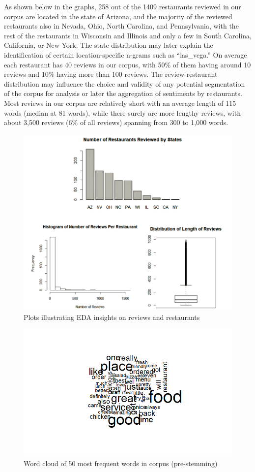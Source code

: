 \documentclass[12pt,twoside]{dukestatscithesis}
\theoremstyle{definition}
\theoremstyle{definition}
\theoremstyle{definition}
\theoremstyle{remark}
\begin{document}
As shown below in the graphs, 258 out of the 1409 restaurants reviewed
in our corpus are located in the state of Arizona, and the majority of
the reviewed restaurants also in Nevada, Ohio, North Carolina, and
Pennsylvania, with the rest of the restaurants in Wisconsin and Illinois
and only a few in South Carolina, California, or New York. The state
distribution may later explain the identification of certain
location-specific n-grams such as ``las\_vega.'' On average each
restaurant has 40 reviews in our corpus, with 50\% of them having around
10 reviews and 10\% having more than 100 reviews. The review-restaurant
distribution may influence the choice and validity of any potential
segmentation of the corpus for analysis or later the aggregation of
sentiments by restaurants. Most reviews in our corpus are relatively
short with an average length of 115 words (median at 81 words), while
there surely are more lengthy reviews, with about 3,500 reviews (6\% of
all reviews) spanning from 300 to 1,000 words.
\begin{figure}[htbp]
\centering
\includegraphics{figure/EDA_combined.png}
\caption{\label{fig:EDA}Plots illustrating EDA insights on reviews and
restaurants}
\end{figure}
\begin{figure}[htbp]
\centering
\includegraphics{figure/raw_wordcloud.png}
\caption{\label{fig:wordcloud}Word cloud of 50 most frequent words in corpus
(pre-stemming)}
\end{figure}
\end{document}

